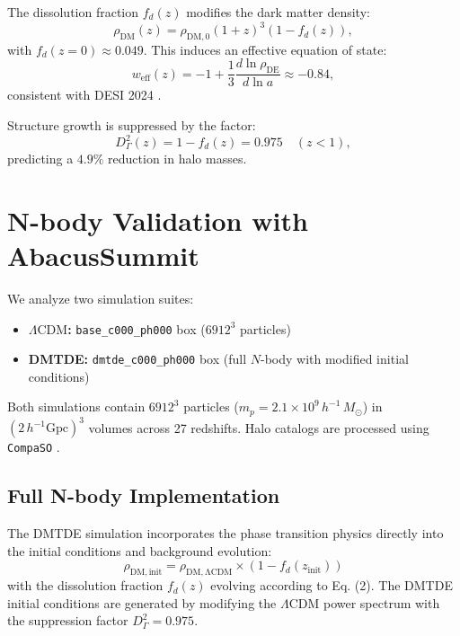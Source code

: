 \documentclass[aps,prd,twocolumn,superscriptaddress,nofootinbib,floatfix,preprintnumbers]{revtex4-2}
\newcommand{\DMTDE}{\textsc{DMTDE}\xspace}
\newcommand{\LCDM}{\ensuremath{\Lambda\text{CDM}}\xspace}
\newcommand{\Msun}{\ensuremath{M_\odot}\xspace}
\begin{document}
The dissolution fraction $f_d(z)$ modifies the dark matter density:
\begin{equation}
\rho_\mathrm{DM}(z) = \rho_\mathrm{DM,0} (1+z)^3 (1 - f_d(z)),
\end{equation}
with $f_d(z=0) \approx 0.049$. This induces an effective equation of state:
\begin{equation}
w_{\mathrm{eff}}(z) = -1 + \frac{1}{3}\frac{d \ln \rho_\mathrm{DE}}{d \ln a} \approx -0.84,
\end{equation}
consistent with DESI 2024 \citep{DESI2024}.

Structure growth is suppressed by the factor:
\begin{equation}
D_\Gamma^2(z) = 1 - f_d(z) = 0.975 \quad (z < 1),
\end{equation}
predicting a $4.9\%$ reduction in halo masses.

\newpage
\section{N-body Validation with AbacusSummit}
\label{sec:abacus}

We analyze two simulation suites:
\begin{itemize}
\item \textbf{\LCDM:} \texttt{base\_c000\_ph000} box ($6912^3$ particles)
\item \textbf{\DMTDE:} \texttt{dmtde\_c000\_ph000} box (full $N$-body with modified initial conditions)
\end{itemize}

Both simulations contain $6912^3$ particles ($m_p = 2.1 \times 10^9\,h^{-1}\,\Msun$) in $(2\,h^{-1}\mathrm{Gpc})^3$ volumes across 27 redshifts. Halo catalogs are processed using \texttt{CompaSO} \citep{garrison2021}.

\subsection{Full N-body Implementation}

The DMTDE simulation incorporates the phase transition physics directly into the initial conditions and background evolution:
\begin{equation}
\rho_{\mathrm{DM, init}} = \rho_{\mathrm{DM, \LCDM}} \times (1 - f_d(z_{\mathrm{init}}))
\end{equation}
with the dissolution fraction $f_d(z)$ evolving according to Eq. (2). The DMTDE initial conditions are generated by modifying the \LCDM power spectrum with the suppression factor $D_\Gamma^2 = 0.975$.
\end{document}
